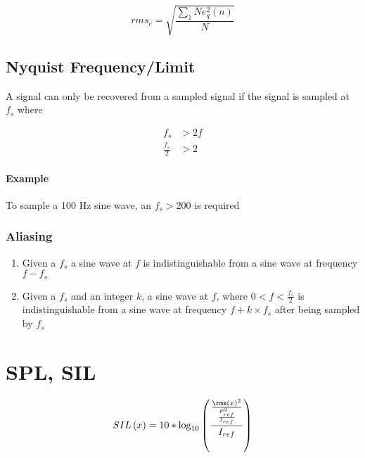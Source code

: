       \begin{equation}
        rms_{e} = \sqrt{\frac{\sum_{1}{N} e_{q}^{2}\left( n \right)}{N}}
      \end{equation}

  \subsection{Nyquist Frequency/Limit}

    A signal can only be recovered from a sampled signal if the signal is
    sampled at $ f_{s} $ where

    \begin{align}
      f_{s} &> 2 f \\
      \frac{f_{s}}{2} &> 2
    \end{align}

    \paragraph{Example}
    To sample a 100 Hz sine wave, an $ f_{s} > 200 $ is required

    \subsubsection{Aliasing}

      \begin{enumerate}
        \item Given a $ f_{s} $ a sine wave at $ f $ is indistinguishable
        from a sine wave at frequency $ f - f_{s} $
        \item Given a $ f_{s} $ and an integer $ k $, a sine wave at
        $ f $, where $ 0 < f < \frac{f_{s}}{2} $ is indistinguishable
        from a sine wave at frequency $ f + k \times f_{s} $ after being sampled
        by $ f_{s} $
      \end{enumerate}


\section{SPL, SIL}

  \begin{equation}
    SIL\left( x \right) = 10 * \log_{10}
    \left(
      \frac
      {
        \frac
        {
          \rms\left( x \right)^{2}
        }
        {
          \frac{P_{ref}^{2}}{I_{ref}}
        }
      }
      {I_{ref}}
    \right)
  \end{equation}

